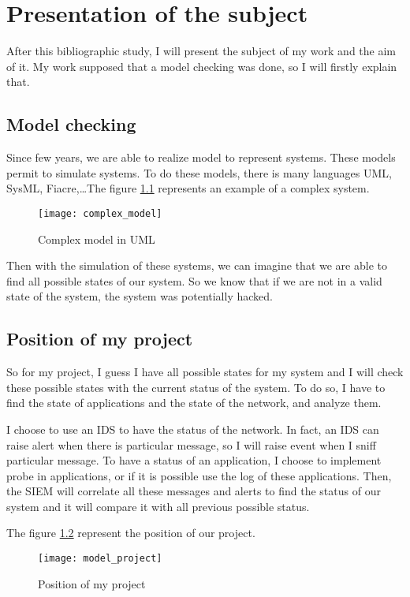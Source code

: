 
\chapter{Presentation of the subject}

After this bibliographic study, I will present the subject of my work and the aim of it. My work supposed that a
model checking was done, so I will firstly explain that.

\section{Model checking}

Since few years, we are able to realize model to represent systems. These models permit to simulate systems. To do
these models, there is many languages UML, SysML, Fiacre,\dots The figure \ref{fig:model} represents an example of
a complex system.

\begin{figure}[h]
  \centering
  \texttt{[image: complex\_model]}
  \caption{Complex model in UML}
  \label{fig:model}
\end{figure}


Then with the simulation of these systems, we can imagine that we are able to find all possible states of our
system. So we know that if we are not in a valid state of the system, the system was potentially hacked.

\section{Position of my project}

So for my project, I guess I have all possible states for my system and I will check these possible states with the
current status of the system. To do so, I have to find the state of applications and the state of the network, and
analyze them.

I choose to use an IDS to have the status of the network. In fact, an IDS can raise alert when there is particular
message, so I will raise event when I sniff particular message. To have a status of an application, I choose to
implement probe in applications, or if it is possible use the log of these applications. Then, the SIEM will
correlate all these messages and alerts to find the status of our system and it will compare it with all previous
possible status.


The figure \ref{fig:model_project} represent the position of our project.

\begin{figure}[h]
  \centering
  \texttt{[image: model\_project]}
  \caption{Position of my project}
  \label{fig:model_project}
\end{figure}




